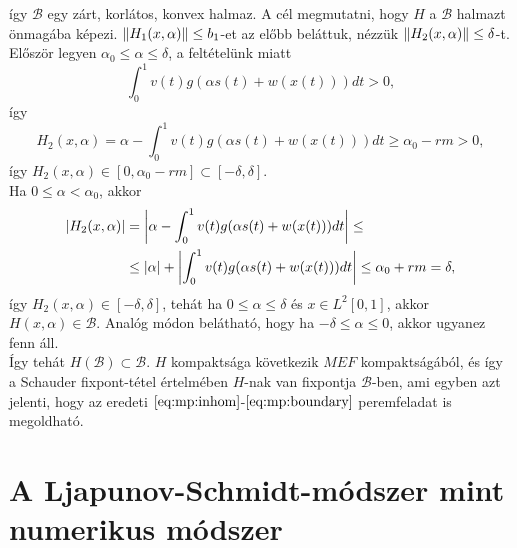 \documentclass[oneside, titlepage, 12pt, a4paper]{report}
\DeclarePairedDelimiter\norm{\lVert}{\rVert}	%
\DeclarePairedDelimiter\abs{\lvert}{\rvert}	%
\begin{document}
így $\mathcal{B}$ egy zárt, korlátos, konvex halmaz. A cél megmutatni, hogy $H$ a $\mathcal{B}$ halmazt önmagába képezi. $\norm{H_1(x, \alpha)} \leq b_1$-et az előbb beláttuk, nézzük $\norm{H_2(x, \alpha)} \leq \delta$-t. \\
Először legyen $\alpha_0 \leq \alpha \leq \delta$, a feltételünk miatt
\begin{equation*}
\int_0^1 v(t) g(\alpha s(t) + w(x(t))) dt > 0,
\end{equation*}
így
\begin{equation*}
H_2(x, \alpha) = \alpha - \int_0^1 v(t) g(\alpha s(t) + w(x(t))) dt \geq \alpha_0 - rm > 0,
\end{equation*}
így $H_2(x, \alpha) \in [0, \alpha_0 - rm] \subset [-\delta, \delta]$. \\
Ha $0 \leq \alpha < \alpha_0$, akkor
\begin{align*}
\abs{H_2(x, \alpha)} &= \abs*{ \alpha - \int_0^1 v(t) g(\alpha s(t) + w(x(t))) dt } \leq \\
 &\leq \abs{\alpha} + \abs*{\int_0^1 v(t) g(\alpha s(t) + w(x(t))) dt} \leq \alpha_0 + rm = \delta,
\end{align*}
így $H_2(x, \alpha) \in [-\delta, \delta]$, tehát ha $0 \leq \alpha \leq \delta$ és $x \in L^2[0, 1]$, akkor $H(x, \alpha) \in \mathcal{B}$. Analóg módon belátható, hogy ha $-\delta \leq \alpha \leq 0$, akkor ugyanez fenn áll. \\
Így tehát $H(\mathcal{B}) \subset \mathcal{B}$. $H$ kompaktsága következik $M E F$ kompaktságából, és így a Schauder fixpont-tétel értelmében $H$-nak van fixpontja $\mathcal{B}$-ben, ami egyben azt jelenti, hogy az eredeti $\eqref{eq:mp:inhom}$-$\eqref{eq:mp:boundary}$ peremfeladat is megoldható.



\onehalfspacing
\chapter{A Ljapunov-Schmidt-módszer mint numerikus módszer}
\label{chap:numeric}
\end{document}
